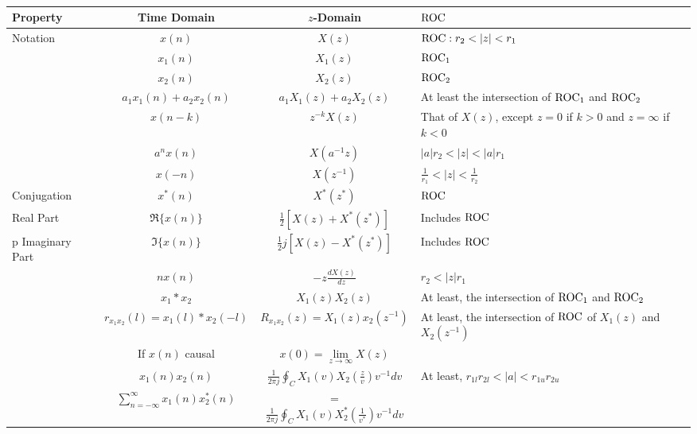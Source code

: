 \begin{table}[h!]
  \centering
  \begin{tabular}{p{4cm}ccp{5cm}}
    \toprule
    Property & Time Domain & $z$-Domain & $\operatorname{\mathrm{ROC}}$ \\
    \midrule
    Notation & $x(n)$ & $X(z)$ & $\operatorname{\mathrm{ROC}}: r_{2} < \lvert z \rvert < r_{1}$ \\
             & $x_{1}(n)$ & $X_{1}(z)$ & $\operatorname{\mathrm{ROC}}_{1}$ \\
             & $x_{2}(n)$ & $X_{2}(z)$ & $\operatorname{\mathrm{ROC}}_{2}$ \\
    \nameref{subsubsec:Z-Transform Linearity} & $a_{1}x_{1}(n) + a_{2}x_{2}(n)$ & $a_{1}X_{1}(z) + a_{2}X_{2}(z)$ & At least the intersection of $\operatorname{\mathrm{ROC}}_{1}$ and $\operatorname{\mathrm{ROC}}_{2}$ \\
    \nameref{subsubsec:Z-Transform Time Shifting} & $x(n-k)$ & $z^{-k}X(z)$ & That of $X(z)$, except $z=0$ if $k>0$ and $z=\infty$ if $k<0$ \\
    \nameref{subsubsec:Z-Domain Scaling} & $a^{n}x(n)$ & $X(a^{-1}z)$ & $\lvert a \rvert r_{2} < \lvert z \rvert < \lvert a \rvert r_{1}$ \\
    \nameref{subsubsec:Z-Transform Time Reversal} & $x(-n)$ & $X(z^{-1})$ & $\frac{1}{r_{1}} < \lvert z \rvert < \frac{1}{r_{2}}$ \\
    Conjugation & $x^{*}(n)$ & $X^{*}(z^{*})$ & $\operatorname{\mathrm{ROC}}$ \\
    Real Part & $\Re \lbrace x(n) \rbrace$ & $\frac{1}{2} \left[ X(z) + X^{*}(z^{*}) \right]$ & Includes $\operatorname{\mathrm{ROC}}$ \\p
    Imaginary Part & $\Im \lbrace x(n) \rbrace$ & $\frac{1}{2} j \left[ X(z) - X^{*}(z^{*}) \right]$ & Includes $\operatorname{\mathrm{ROC}}$ \\
    \nameref{subsubsec:Z-Domain Differentiation} & $nx(n)$ & $-z \frac{dX(z)}{dz}$ & $r_{2} < \lvert z \rvert r_{1}$ \\
    \nameref{subsubsec:Z-Domain Convolutions} & $x_{1} * x_{2}$ & $X_{1}(z)X_{2}(z)$ & At least, the intersection of $\operatorname{\mathrm{ROC}}_{1}$ and $\operatorname{\mathrm{ROC}}_{2}$ \\
    \nameref{subsubsec:Z-Transform 2 Sequence Correlation} & $r_{x_{1}x_{2}}(l) = x_{1}(l) * x_{2}(-l)$ & $R_{x_{1}x_{2}}(z) = X_{1}(z)x_{2}(z^{-1})$ & At least, the intersection of $\operatorname{\mathrm{ROC}}$ of $X_{1}(z)$ and $X_{2}(z^{-1})$ \\
    \nameref{subsubsec:Initial Value Theorem for Z-Transform} & If $x(n)$ causal & $x(0) = \lim\limits_{z \rightarrow \infty} X(z)$ & \\
    \nameref{subsubsec:Z-Transform 2 Sequence Multiplication} & $x_{1}(n)x_{2}(n)$ & $\frac{1}{2 \pi j} \oint_{C} X_{1}(v)X_{2}(\frac{z}{v}) v^{-1} dv$ & At least, $r_{1l}r_{2l} < \lvert a \rvert < r_{1u}r_{2u}$ \\
    \nameref{subsubsec:Parsevals Relation for Z-Transform} & $\sum\limits_{n=-\infty}^{\infty} x_{1}(n)x_{2}^{*}(n)$ &= $\frac{1}{2 \pi j} \oint_{C} X_{1}(v)X_{2}^{*}(\frac{1}{v^{*}})v^{-1} dv$ & \\
    \bottomrule
  \end{tabular}
  \caption{}
  \label{tab:Z-Transform Properties}
\end{table}

